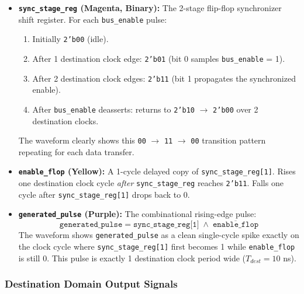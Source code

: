 \documentclass[12pt,a4paper]{article}
\begin{document}
\begin{itemize}
    \item \textbf{\texttt{sync\_stage\_reg} (Magenta, Binary):} The 2-stage flip-flop synchronizer shift register. For each \texttt{bus\_enable} pulse:
    \begin{enumerate}
        \item Initially \texttt{2'b00} (idle).
        \item After 1 destination clock edge: \texttt{2'b01} (bit 0 samples \texttt{bus\_enable} = 1).
        \item After 2 destination clock edges: \texttt{2'b11} (bit 1 propagates the synchronized enable).
        \item After \texttt{bus\_enable} deasserts: returns to \texttt{2'b10} $\to$ \texttt{2'b00} over 2 destination clocks.
    \end{enumerate}
    The waveform clearly shows this \texttt{00} $\to$ \texttt{11} $\to$ \texttt{00} transition pattern repeating for each data transfer.
    
    \item \textbf{\texttt{enable\_flop} (Yellow):} A 1-cycle delayed copy of \texttt{sync\_stage\_reg[1]}. Rises one destination clock cycle \emph{after} \texttt{sync\_stage\_reg} reaches \texttt{2'b11}. Falls one cycle after \texttt{sync\_stage\_reg[1]} drops back to 0.
    
    \item \textbf{\texttt{generated\_pulse} (Purple):} The combinational rising-edge pulse:
    \[
        \texttt{generated\_pulse} = \texttt{sync\_stage\_reg[1]} \;\land\; \overline{\texttt{enable\_flop}}
    \]
    The waveform shows \texttt{generated\_pulse} as a clean single-cycle spike exactly on the clock cycle where \texttt{sync\_stage\_reg[1]} first becomes 1 while \texttt{enable\_flop} is still 0. This pulse is exactly 1 destination clock period wide ($T_{dest} = 10$ ns).
\end{itemize}

\subsubsection{Destination Domain Output Signals}
\end{document}
